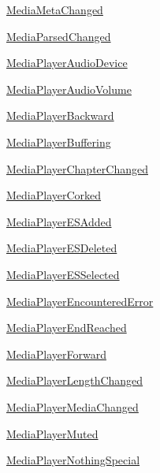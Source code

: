 \begin{DoxyCompactItemize}
\item 
\hyperlink{classvlc_1_1_event_type_a2bb6715b477bde4ff31a99135e2048e7}{Media\+Meta\+Changed}
\item 
\hyperlink{classvlc_1_1_event_type_a271ecb77c223140bb89a964ab4af38d2}{Media\+Parsed\+Changed}
\item 
\hyperlink{classvlc_1_1_event_type_a5d4091281f69ba20c9db82f2045402b1}{Media\+Player\+Audio\+Device}
\item 
\hyperlink{classvlc_1_1_event_type_ad8c333df19a8f54ee61b8306ce88afd3}{Media\+Player\+Audio\+Volume}
\item 
\hyperlink{classvlc_1_1_event_type_a0cdf53bd7c829de8b87ade77bad3ef7c}{Media\+Player\+Backward}
\item 
\hyperlink{classvlc_1_1_event_type_a049741bb42e23e70664751f026e8be4d}{Media\+Player\+Buffering}
\item 
\hyperlink{classvlc_1_1_event_type_a82ad7b72fbae30e8273320410dd39341}{Media\+Player\+Chapter\+Changed}
\item 
\hyperlink{classvlc_1_1_event_type_ab330bfc19b0024993f74dc1ffc703577}{Media\+Player\+Corked}
\item 
\hyperlink{classvlc_1_1_event_type_ac86b902cfb26a1b301f795096b0f6587}{Media\+Player\+E\+S\+Added}
\item 
\hyperlink{classvlc_1_1_event_type_a9281df1642df77fa897ead4ffd7ac4dd}{Media\+Player\+E\+S\+Deleted}
\item 
\hyperlink{classvlc_1_1_event_type_a092d905e1c1a2279521a933895ef01c5}{Media\+Player\+E\+S\+Selected}
\item 
\hyperlink{classvlc_1_1_event_type_ad39a6c9008c3793dd949afcb2893943d}{Media\+Player\+Encountered\+Error}
\item 
\hyperlink{classvlc_1_1_event_type_ac748905e4049d0cc988b453e22205a3e}{Media\+Player\+End\+Reached}
\item 
\hyperlink{classvlc_1_1_event_type_ac3af5254e2b1f80e1d7557d43c56abbc}{Media\+Player\+Forward}
\item 
\hyperlink{classvlc_1_1_event_type_a7a6bdfc6d23656ad9b432e30445cef6b}{Media\+Player\+Length\+Changed}
\item 
\hyperlink{classvlc_1_1_event_type_a1282656dec5897a6dc0772de037109fe}{Media\+Player\+Media\+Changed}
\item 
\hyperlink{classvlc_1_1_event_type_ab9a394308c1f2c9526461419254b6419}{Media\+Player\+Muted}
\item 
\hyperlink{classvlc_1_1_event_type_ad18a9f5839c236d755755bd80a849bd7}{Media\+Player\+Nothing\+Special}

\end{DoxyCompactItemize}

